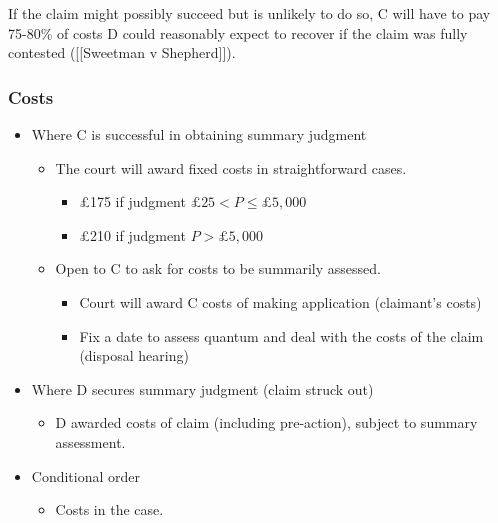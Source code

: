 \documentclass[
]{article}
\providecommand{\tightlist}{%
  \setlength{\itemsep}{0pt}\setlength{\parskip}{0pt}}
\begin{document}
If the claim might possibly succeed but is unlikely to do so, C will
have to pay 75-80\% of costs D could reasonably expect to recover if the
claim was fully contested ({[}{[}Sweetman v Shepherd{]}{]}).

\hypertarget{costs-1}{%
\subsubsection{Costs}\label{costs-1}}

\begin{itemize}
\tightlist
\item
  Where C is successful in obtaining summary judgment

  \begin{itemize}
  \tightlist
  \item
    The court will award fixed costs in straightforward cases.

    \begin{itemize}
    \tightlist
    \item
      £175 if judgment \(£25 < P \leq £5,000\)
    \item
      £210 if judgment \(P > £5,000\)
    \end{itemize}
  \item
    Open to C to ask for costs to be summarily assessed.

    \begin{itemize}
    \tightlist
    \item
      Court will award C costs of making application (claimant's costs)
    \item
      Fix a date to assess quantum and deal with the costs of the claim
      (disposal hearing)
    \end{itemize}
  \end{itemize}
\item
  Where D secures summary judgment (claim struck out)

  \begin{itemize}
  \tightlist
  \item
    D awarded costs of claim (including pre-action), subject to summary
    assessment.
  \end{itemize}
\item
  Conditional order

  \begin{itemize}
  \tightlist
  \item
    Costs in the case.
  \end{itemize}
\end{itemize}
\end{document}
